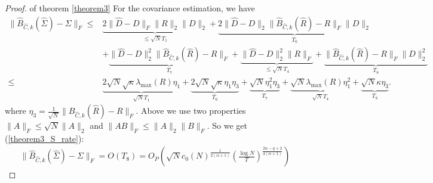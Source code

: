 \begin{proof}{of theorem \ref{theorem3}}
For the covariance estimation, we have 
\begin{equation}
	\begin{split}
		\lVert \hat B_{\hat C,k}(\hat \Sigma) - \Sigma \rVert_F \leq & 
		    \underbrace{ 2 \lVert \hat D -	D \rVert_F \lVert R \rVert_2 \lVert D \rVert_2 }_{\leq \sqrt N T_1} + 
		    \underbrace{ 2\lVert \hat D - D \rVert_2 \lVert \hat B_{\hat C,k}(\hat R) - R \rVert_F \lVert D \rVert_2 }_{T_6} \\
	    & + \underbrace{ \lVert \hat D - D \rVert_2^2 \lVert \hat B_{\hat C,k}(\hat R) - R \rVert_F }_{T_7} + 
	        \underbrace{ \lVert \hat D - D \rVert_2^2 \lVert R \rVert_F }_{\leq \sqrt N T_4} + 
	        \underbrace{ \lVert \hat B_{\hat C,k}(\hat R) - R \rVert_F \lVert D \rVert_2^2 }_{T_8} \\
        \leq & \underbrace{ 2 \sqrt N \sqrt \kappa \lambda_{\max}(R) \eta_1 }_{ \sqrt N T_1} + 
            \underbrace{ 2 \sqrt N \sqrt{\kappa} \eta_1 \eta_3}_{T_6} + 
            \underbrace{ \sqrt N \eta_1^2 \eta_3 }_{T_7} + 
            \underbrace{ \sqrt N \lambda_{\max}(R) \eta_1^2 }_{\sqrt N T_4} + 
            \underbrace{\sqrt N \kappa \eta_3}_{T_8} .
    \end{split}
    \label{cor2cov F}
\end{equation}
where $\eta_3 = \frac{1}{\sqrt N} \| B_{\hat C, k}(\hat R) - R \|_F $. Above we use two properties $\|A\|_F \leq \sqrt N \|A\|_2$ and $\|AB\|_F \leq \|A\|_2 \|B\|_F$. So we get (\ref{theorem3_S_rate}):
\begin{equation}
	\begin{split}
		\| \hat B_{\hat C, k}(\hat \Sigma) - \Sigma \|_F = O(T_8) 
        = O_P(  \sqrt N  c_0(N)^\frac{1}{2(\alpha + 1)} (\frac{\log N}{T})^\frac{2\alpha - q + 2}{4(\alpha + 1)}  ) 
	\end{split}
\end{equation}
\end{proof}
